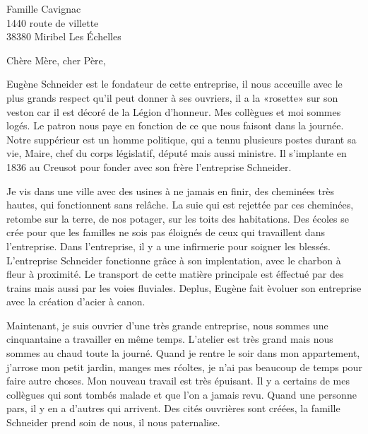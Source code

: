 \documentclass[11pt]{lettre}
\makeatletter
\newcommand*{\NoRule}{\renewcommand*{\rule@length}{0.5}}
\makeatother
\begin{document}
\begin{tt}
\begin{letter}{Famille Cavignac \\1440 route de villette\\38380 Miribel Les \'Echelles }
\NoRule
{}
\address{Lespinasse Florentin\\2 Rue André Marie Ampère\\71530 Champforgeuil}
\date{ le 19 ao\^ut 1845}
\notelephone%
\noemail%
\nofax

\def\concname{Objet :~} %
\opening{Chère M\`ere, cher P\`ere,}
\begin{paragraphe}\par
Eug\`ene Schneider est le fondateur de cette entreprise, il nous acceuille avec le plus grands respect qu'il peut donner \`a ses ouvriers, il a la «rosette» sur son veston car il est d\'ecor\'e de la L\'egion d'honneur. 
Mes coll\`egues et moi sommes log\'es. 
Le patron nous paye en fonction de ce que nous faisont dans la journ\'ee. 
Notre supp\'erieur est un homme politique, qui a tennu plusieurs postes durant sa vie, Maire, chef du corps l\'egislatif, d\'eput\'e mais aussi ministre. 
Il s'implante en 1836 au Creusot pour fonder avec son fr\`ere l'entreprise Schneider. 
\end{paragraphe}

\begin{paragraphe}\par
Je vis dans une ville avec des usines \`a ne jamais en finir, des chemin\'ees tr\`es hautes, qui fonctionnent sans rel\^ache. 
La suie qui est rejett\'ee par ces chemin\'ees, retombe sur la terre, de nos potager, sur les toits des habitations. 
Des \'ecoles se cr\'ee pour que les familles ne sois pas \'eloign\'es de ceux qui travaillent dans l'entreprise. 
Dans l'entreprise, il y a une infirmerie pour soigner les bless\'es. 
L'entreprise Schneider fonctionne gr\^ace \`a son implentation, avec le charbon \`a fleur \`a proximit\'e. 
Le transport de cette mati\`ere principale est \'effectu\'e par des trains mais aussi par les voies fluviales. 
Deplus, Eug\`ene fait \`evoluer son entreprise avec la cr\'eation d'acier \`a canon. 
\end{paragraphe}

\begin{paragraphe}\par
Maintenant, je suis ouvrier d'une tr\`es grande entreprise, nous sommes une cinquantaine a travailler en m\^eme temps. 
L'atelier est tr\`es grand mais nous sommes au chaud toute la journ\'e. 
Quand je rentre le soir dans mon appartement, j'arrose mon petit jardin, manges mes r\'coltes, je n'ai pas beaucoup de temps pour faire autre choses. 
Mon nouveau travail est tr\`es \'epuisant.
Il y a certains de mes coll\`egues qui sont tomb\'es malade et que l'on a jamais revu. 
Quand une personne pars, il y en a d'autres qui arrivent. 
Des cit\'es ouvri\`eres sont cr\'e\'ees, la famille Schneider prend soin de nous, il nous paternalise. 
\end{paragraphe}


\end{letter}
\end{tt}
\end{document}

